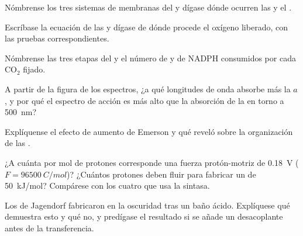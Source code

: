 \begin{exercise}[$\star$]\label{exo:b1:photosynthesis:1}
Nómbrense los tres sistemas de membranas del  y dígase dónde
ocurren las  y el .
\end{exercise}

\begin{exercise}[$\star$]\label{exo:b1:photosynthesis:2}
Escríbase la ecuación de las  y dígase de dónde procede
el oxígeno liberado, con las pruebas correspondientes.
\end{exercise}

\begin{exercise}[$\star$]\label{exo:b1:photosynthesis:3}
Nómbrense las tres etapas del  y el número de  y de NADPH
consumidos por cada $\mathrm{CO_2}$ fijado.
\end{exercise}

\begin{exercise}[$\star$]\label{exo:b1:photosynthesis:4}
A partir de la figura de los espectros, ¿a qué longitudes de onda absorbe
más la  $a$, y por qué el espectro de acción es más alto que la
absorción de la  en torno a \qty{500}{nm}?
\end{exercise}

\begin{exercise}[$\star\star$]\label{exo:b1:photosynthesis:5}
Explíquense el efecto de aumento de Emerson y qué reveló sobre la
organización de las .
\end{exercise}

\begin{exercise}[$\star\star$]\label{exo:b1:photosynthesis:6}
¿A cuánta  por mol de protones corresponde una fuerza
protón-motriz de \qty{0.18}{V} ($F = \qty{96500}{C/mol}$)? ¿Cuántos protones
deben fluir para fabricar un  de \qty{50}{kJ/mol}? Compárese con los
cuatro que usa la sintasa.
\end{exercise}

\begin{exercise}[$\star\star$]\label{exo:b1:photosynthesis:7}
Los  de Jagendorf fabricaron  en la oscuridad tras un baño
ácido. Explíquese qué demuestra esto y qué no, y predígase el resultado si
se añade un desacoplante antes de la transferencia.
\end{exercise}

